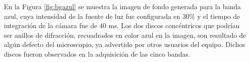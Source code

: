 En la Figura \ref{fig:bgazul} se muestra la imagen de fondo generada para la banda azul, cuya intensidad de la fuente de luz fue configurada en 30$\%$ y el tiempo de integración de la cámara fue de 40 ms. Los dos discos concéntricos que podrían ser anillos de difracción, recuadrados en color azul en la imagen, son resultado de algún defecto del microscopio, ya advertido por otros usuarios del equipo. Dichos discos fueron observados en la adquisición de las cinco bandas. 
	\begin{figure}[H]
		\begin{floatrow}

\end{floatrow}
\end{figure}
